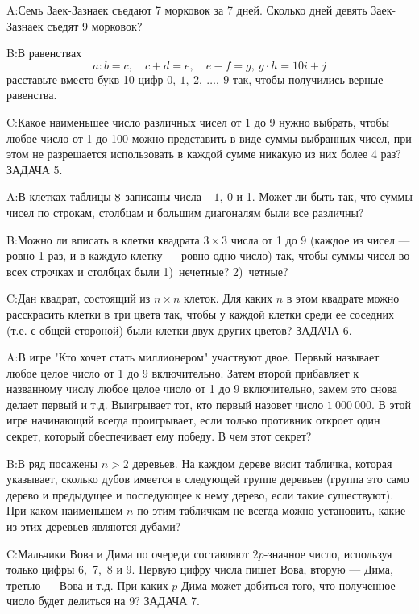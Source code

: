 \documentclass[10pt]{scrbook} \usepackage{modules/nonstahp_book}
\begin{document}
A:\qquad Семь Заек-Зазнаек съедают 7 морковок за 7 дней. Сколько дней девять  Заек-Зазнаек съедят 9 морковок?

B:\qquad В равенствах
$$
a:b=c,\quad c+d=e,\quad e-f=g,\ g\cdot h=10i+j
$$
расставьте вместо букв 10 цифр $0,\ 1,\ 2,\ \ldots,\ 9$ так, чтобы получились верные равенства.

C:\qquad Какое наименьшее число различных чисел от 1 до 9 нужно выбрать, чтобы любое число от 1 до 100 можно представить в виде суммы выбранных чисел, при этом  не разрешается использовать в каждой сумме  никакую из них более 4 раз?
\medbreak
\noindent
ЗАДАЧА 5.

A:\qquad В клетках таблицы $8\time8$ записаны числа $-1,\ 0$ и 1. Может ли быть так, что суммы чисел по строкам, столбцам и большим диагоналям были все различны?

B:\qquad  Можно ли вписать в клетки квадрата $3\times 3$ числа от 1 до 9 (каждое из чисел — ровно 1 раз, и в каждую клетку — ровно одно число) так, чтобы суммы чисел во всех строчках и столбцах были 1)\ нечетные? 2)\ четные?

C:\qquad Дан квадрат, состоящий из $n\times n$ клеток. Для каких $n$ в этом квадрате можно расскрасить клетки в три цвета так, чтобы у каждой клетки среди ее соседних (т.е. с общей стороной) были клетки двух других цветов?
\medbreak
\noindent
ЗАДАЧА 6.

A:\qquad В игре "Кто хочет стать миллионером" участвуют двое. Первый называет любое целое число от 1 до 9 включительно. Затем второй прибавляет к названному числу любое целое число от 1 до 9 включительно, замем это снова делает первый и т.д. Выигрывает тот, кто первый назовет число  $1\ 000\ 000.$ В этой игре начинающий  всегда проигрывает, если только противник откроет один секрет, который обеспечивает ему победу. В чем этот секрет?

B:\qquad В ряд посажены $n>2$ деревьев. На каждом дереве висит табличка, которая указывает, сколько дубов имеется в следующей группе деревьев (группа это само дерево и предыдущее и последующее к нему дерево, если такие существуют). При каком наименьшем $n$  по этим табличкам не всегда можно установить, какие из этих деревьев являются дубами?

C:\qquad Мальчики Вова и Дима по очереди составляют $2p$-значное число, используя только цифры 6,\ 7,\ 8 и 9. Первую цифру числа пишет Вова, вторую — Дима, третью — Вова и т.д. При каких $p$ Дима может добиться того, что полученное число будет делиться на 9? 
\medbreak
\noindent
ЗАДАЧА 7.
\end{document}
